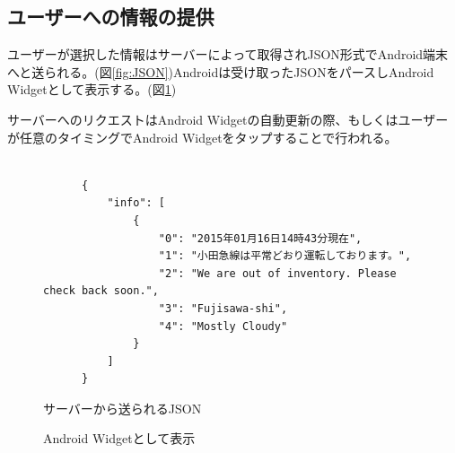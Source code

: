 \subsection{ユーザーへの情報の提供}
ユーザーが選択した情報はサーバーによって取得されJSON形式でAndroid端末へと送られる。(図\ref{fig:JSON})Androidは受け取ったJSONをパースしAndroid Widgetとして表示する。(図\ref{fig:widget})

サーバーへのリクエストはAndroid Widgetの自動更新の際、もしくはユーザーが任意のタイミングでAndroid Widgetをタップすることで行われる。

\begin{figure}[htbp]
  \begin{minipage}{\hsize}
    \begin{center}
      \begin{lstlisting}[basicstyle=\ttfamily\footnotesize, frame=single]

      {
          "info": [
              {
                  "0": "2015年01月16日14時43分現在",
                  "1": "小田急線は平常どおり運転しております。",
                  "2": "We are out of inventory. Please check back soon.",
                  "3": "Fujisawa-shi",
                  "4": "Mostly Cloudy"
              }
          ]
      }

      \end{lstlisting}
    \end{center}
    \caption{サーバーから送られるJSON}
    \label{fig:JSON}
  \end{minipage}

  \begin{minipage}{\hsize}
    \begin{center}
    \end{center}
    \caption{Android Widgetとして表示}
    \label{fig:widget}
  \end{minipage}
\end{figure}

\nocite{*}
